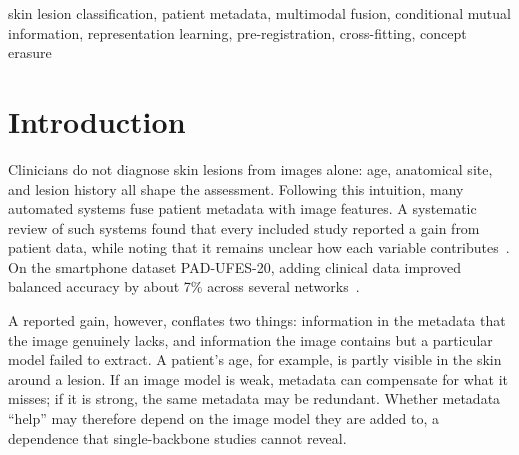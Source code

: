 \documentclass[conference]{IEEEtran}
\begin{document}
\begin{IEEEkeywords}
skin lesion classification, patient metadata, multimodal fusion, conditional mutual information, representation learning, pre-registration, cross-fitting, concept erasure
\end{IEEEkeywords}

\section{Introduction}
Clinicians do not diagnose skin lesions from images alone: age, anatomical site, and lesion history all shape the assessment. Following this intuition, many automated systems fuse patient metadata with image features. A systematic review of such systems found that every included study reported a gain from patient data, while noting that it remains unclear how each variable contributes~\cite{hohn2021review}. On the smartphone dataset PAD-UFES-20, adding clinical data improved balanced accuracy by about 7\% across several networks~\cite{pacheco2020impact}.

A reported gain, however, conflates two things: information in the metadata that the image genuinely lacks, and information the image contains but a particular model failed to extract. A patient's age, for example, is partly visible in the skin around a lesion. If an image model is weak, metadata can compensate for what it misses; if it is strong, the same metadata may be redundant. Whether metadata ``help'' may therefore depend on the image model they are added to, a dependence that single-backbone studies cannot reveal.
\end{document}
